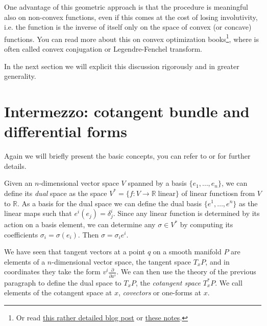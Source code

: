 \documentclass[english,fontsize=11pt,paper=a5,oneside]{scrbook}
\newcommand{\R}{\mathbb{R}}
\theoremstyle{definition}
\begin{document}
One advantage of this geometric approach is that the procedure is meaningful also on non-convex functions, even if this comes at the cost of losing involutivity, i.e. the function is the inverse of itself only on the space of convex (or concave) functions.
You can read more about this on convex optimization books\footnote{Or read \href{https://web.archive.org/web/20211127141805/https://jmanton.wordpress.com/2010/11/21/introduction-to-the-legendre-transform/}{this rather detailed blog post} or \href{https://web.archive.org/web/20170407134235/http://www.physics.sun.ac.za/~htouchette/archive/notes/lfth2.pdf}{these notes}.}, where is often called convex conjugation or Legendre-Fenchel transform.

In the next section we will explicit this discussion rigorously and in greater generality.

\section{Intermezzo: cotangent bundle and differential forms}

Again we will briefly present the basic concepts, you can refer to \cite{book:lee} or \cite[Chapters 5-7]{lectures:aom:seri} for further details.

Given an $n$-dimensional vector space $V$ spanned by a basis $\{e_1, \ldots, e_n\}$, we can define its \emph{dual} space as the space $V^* = \{f : V \to \R \; \mbox{linear}\}$ of linear functiosn from $V$ to $\R$.
As a basis for the dual space we can define the dual basis $\{e^1, \ldots, e^n\}$ as the linear maps such that $e^i(e_j) = \delta^i_j$. Since any linear function is determined by its action on a basis element, we can determine any $\sigma \in V^*$ by computing its coefficients $\sigma_i = \sigma(e_i)$. Then $\sigma = \sigma_i e^i$.

We have seen that tangent vectors at a point $q$ on a smooth manifold $P$ are elements of a $n$-dimensional vector space, the tangent space $T_x P$, and in coordinates they take the form $v^i \frac{\partial}{\partial x^i}$.
We can then use the theory of the previous paragraph to define the dual space to $T_x P$, the \emph{cotangent space} $T^*_x P$.
We call elements of the cotangent space at $x$, \emph{covectors} or one-forms at $x$.
\end{document}
